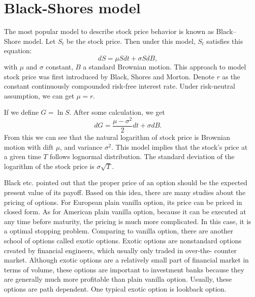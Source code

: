 \documentclass[11pt]{book}
\begin{document}
\section{Black-Shores model}   
The most popular model to describe stock price behavior is known as Black--Shore model. Let $S_t$ be the stock price. Then under this model, $S_t$ satisfies this equation: 
\begin{equation}\label{eq:1}
dS = \mu Sdt + \sigma SdB, 
\end{equation}
with $\mu$ and $\sigma $ constant, $B$ a standard Brownian motion. This approach to model stock price was first introduced by Black, Shores and Morton. Denote $r$ as the constant continuously compounded risk-free interest rate. Under risk-neutral assumption, we can get $\mu = r $. 

If we define $G = \ln S$. After some calculation, we get 
\begin{equation}\label{eq:2}
dG = \frac{\mu - \sigma ^2 }{2} dt + \sigma dB.
\end{equation}
From this we can see that the natural logarithm of stock price is Brownian motion with dift $\mu$, and variance $\sigma^2$. This model implies that the stock's price at a given time $T$ follows lognormal distribution. The standard deviation of the logarithm of the stock price is $\sigma \sqrt{T}$. 

Black etc. \cite{Black:1973} pointed out that the proper price of an option should be the expected present value of its payoff. Based on this idea, there are many studies about the pricing of options. For European plain vanilla option, its price can be priced in closed form. As for American plain vanilla option, because it can be executed at any time before maturity, the pricing is much more complicated. In this case, it is a optimal stopping problem. Comparing to vanilla option, there are another school of options called exotic options. Exotic options are nonstandard options created by financial engineers, which usually only traded in over-the- counter market. Although exotic options are a relatively small part of financial market in terms of volume, these options are important to investment banks because they are generally much more profitable than plain vanilla option. Usually, these options are path dependent. One typical exotic option is lookback option.

\end{document}
